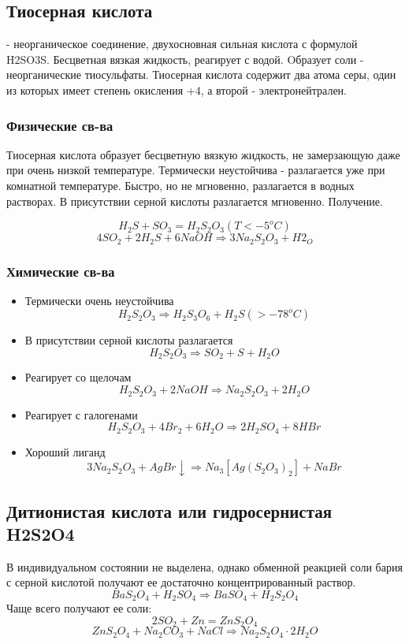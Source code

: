 \documentclass[11pt]{article}
\begin{document}
\subsection{Тиосерная кислота} - неорганическое соединение, двухосновная сильная кислота с
формулой H2SO3S. Бесцветная вязкая жидкость, реагирует с водой. Oбразует соли -
неорганические тиосульфаты. Тиосерная кислота содержит два атома серы, один из
которых имеет степень окисления +4, а второй - электронейтрален.

\subsubsection{Физические св-ва}

Тиосерная кислота образует бесцветную вязкую жидкость, не замерзающую даже при очень
низкой температуре. Термически неустойчива - разлагается уже при комнатной
температуре. Быстро, но не мгновенно, разлагается в водных растворах. В
присутствии серной кислоты разлагается мгновенно.
Получение.

$$H_2S + SO_3 = H_2S_2O_3 (T < -5^oC)$$
$$4SO_2 + 2H_2S + 6NaOH \Rightarrow 3Na_2S _2O_3 + H2_ O$$
\subsubsection{Химические св-ва}
\begin{itemize}
\item Термически очень неустойчива
$$H_2S_2O_3 \Rightarrow H_2S_3O_6 + H_2S (>-78^oC)$$
\item В присутствии серной кислоты разлагается
$$H_2S_2O_3 \Rightarrow SO_2 + S + H_2O$$
\item Реагирует со щелочам
$$H_2S_2O_3 + 2NaOH \Rightarrow Na_2S_2O_3 + 2H_2O$$
\item Реагирует с галогенами
$$H_2S_2O_3 + 4Br_2 + 6H_2O \Rightarrow 2H_2SO_4 + 8HBr$$
\item Хороший лиганд
 $$3Na_2S_2O_3 + AgBr \downarrow \Rightarrow Na_3[Ag(S_2O_3)_2] + NaBr$$
\end{itemize}

\subsection{Дитионистая кислота или гидросернистая H2S2O4}
В индивидуальном состоянии не выделена, однако обменной реакцией соли бария с серной
кислотой получают ее достаточно концентрированный раствор.
$$BaS_2O_4 + H_2SO_4 \Rightarrow BaSO_4 + H_2S_2O_4$$
Чаще всего получают ее соли:
$$2SO_2 + Zn = ZnS_2O_4$$
$$ZnS_2O_4 + Na_2CO_3 + NaCl \Rightarrow Na_2S_2O_4 \cdot 2H_2O$$
\end{document}

